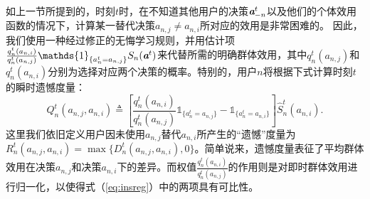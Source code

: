 如上一节所提到的，时刻$t$时，在不知道其他用户的决策$\emph{\textbf{a}}^t_{-n}$以及他们的个体效用函数的情况下，计算某一替代决策$a_{n,j}\neq a_{n,i}$所对应的效用是非常困难的。
因此，我们使用一种经过修正的无悔学习规则\cite{Hart_areinforcement}，并用估计项$\frac{q^t_n(a_{n,i})}{q^t_n(a_{n,j})}\mathds{1}_{\{a^t_n=a_{n,j}\}}S_n(\A^t)$来代替所需的明确群体效用，其中$q^t_n(a_{n,j})$和$q^t_n(a_{n,i})$分别为选择对应两个决策的概率。特别的，用户$n$将根据下式计算时刻$t$的瞬时遗憾度量：
\begin{equation}\label{eq:insreg}
Q^t_n(a_{n,j},a_{n,i})\triangleq\left[\frac{q^t_n(a_{n,i})}{q^t_n(a_{n,j})}\mathds{1}_{\{a^t_n=a_{n,j}\}}-\mathds{1}_{\{a^t_n=a_{n,i}\}}\right]\hat{S}^t_n(a_{n,i}).
\end{equation}
这里我们依旧定义用户因未使用$a_{n,j}$替代$a_{n,i}$所产生的“遗憾”度量为$R_n^t(a_{n,j},a_{n,i})=\max\{D_n^t(a_{n,j},a_{n,i}),0\}$。简单说来，遗憾度量表征了平均群体效用在决策$a_{n,j}$和决策$a_{n,i}$下的差异。而权值$\frac{q^t_n(a_{n,i})}{q^t_n(a_{n,j})}$的作用则是对即时群体效用进行归一化，以使得式（\ref{eq:insreg}）中的两项具有可比性。

